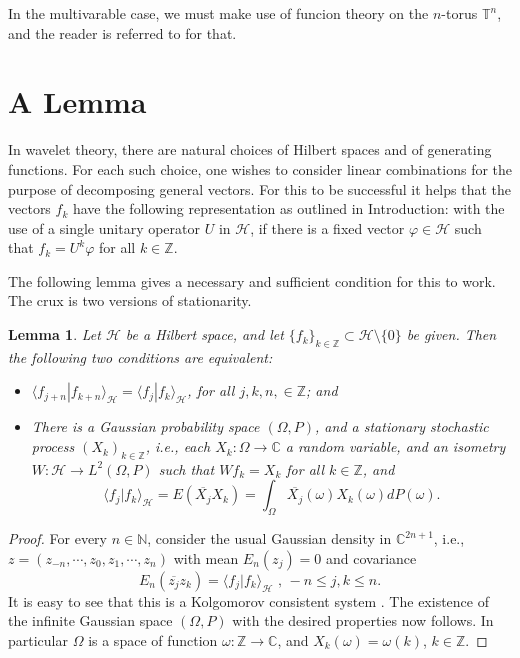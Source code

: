 \documentclass{birkmult}
\newtheorem{lem}[thm]{Lemma}
\theoremstyle{definition}
\theoremstyle{remark}
\numberwithin{equation}{section}
\begin{document}
     In the multivarable case, we must make use of funcion theory on the 
$n$-torus $\mathbb{T}^{n}$, and the reader is referred to \cite{Rud69, Rud86} 
for that.

\section{A Lemma}
\label{sec:1a}
In wavelet theory, there are natural choices of Hilbert spaces and of 
generating functions.  For each such choice, one wishes to consider linear 
combinations for the purpose of decomposing general vectors.  For this to 
be successful it helps that the vectors $f_{k}$ have the following 
representation as outlined in Introduction: with the use of 
a single unitary operator $U$ in $\mathcal{H}$, if there is a 
fixed vector $\varphi \in \mathcal{H}$ such that $f_{k} = U^{k}\varphi$ 
for all $k \in \mathbb{Z}$. 

The following lemma gives a necessary and sufficient condition for 
this to work.  The crux is two versions of stationarity.

\begin{lem}
\label{L:1.1}
Let $\mathcal{H}$ be a Hilbert space, and let 
$\{f_{k}\}_{k \in \mathbb{Z}} \subset \mathcal{H} \setminus \{0\}$ be 
given.  Then the following two conditions are equivalent:
\begin{itemize}
  \item[(i)] $\langle f_{j+n} | f_{k+n} \rangle_{\mathcal{H}}
  = \langle f_{j} | f_{k} \rangle_{\mathcal{H}}$,  for all 
  $j, k, n, \in \mathbb{Z}$; and\\
  \item[(ii)] There is a Gaussian probability space $(\Omega, P)$, and a 
  stationary stochastic process $(X_{k})_{k \in \mathbb{Z}}$, i.e., each 
  $X_{k}: \Omega \to \mathbb{C}$ a random variable, and an isometry 
  $W: \mathcal{H} \to L^{2}(\Omega, P)$ such that $Wf_{k}=X_{k}$ for all 
  $k \in \mathbb{Z}$, and 
  \[
    \langle f_{j} | f_{k} \rangle_{\mathcal{H}} = E(\overline{X_{j}} X_{k})
   = \int_{\Omega}\overline{X_{j}}(\omega)X_{k}(\omega)dP(\omega).
  \]
\end{itemize}
\end{lem}
\begin{proof}
For every $n \in \mathbb{N}$, consider the usual Gaussian density in 
$\mathbb{C}^{2n+1}$, i.e., $z=(z_{-n}, \cdots, z_{0}, z_{1}, \cdots, z_{n})$ 
with mean $E_{n}(z_{j})=0$ and covariance 
\[
  E_{n}(\overline{z_{j}}z_{k})=\langle f_{j} | f_{k} \rangle_{\mathcal{H}} 
  \text{  , } -n \leq j, k \leq n.
\]
It is easy to see that this is a Kolgomorov consistent system 
\cite{Jor06, Nel69}.  The existence of the infinite Gaussian space 
$(\Omega, P)$ with the desired properties now follows.  In particular $\Omega$ 
is a space of function $\omega : \mathbb{Z} \to \mathbb{C}$, and 
$X_{k}(\omega) = \omega(k)$, $k \in \mathbb{Z}$.
\end{proof}
\end{document}

